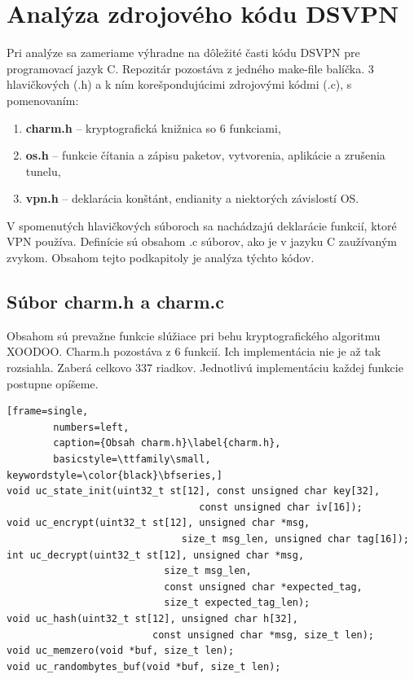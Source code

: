 \section{Analýza zdrojového kódu DSVPN}
 Pri analýze sa zameriame výhradne na dôležité časti kódu DSVPN pre programovací jazyk C. Repozitár pozostáva z jedného make-file balíčka\cite{make}. 3 hlavičkových (.h) a k ním korešpondujúcimi zdrojovými kódmi (.c), s pomenovaním:
 \begin{enumerate}
 	\item \textbf{charm.h} -- kryptografická knižnica so 6 funkciami,
 	\item \textbf{os.h} -- funkcie čítania a zápisu paketov, vytvorenia, aplikácie a zrušenia tunelu,
 	\item \textbf{vpn.h} -- deklarácia konštánt, endianity\cite{endianita} a niektorých závislostí OS.
 \end{enumerate}

 V spomenutých hlavičkových súboroch sa nachádzajú deklarácie funkcií, ktoré VPN používa. Definície sú obsahom .c súborov, ako je v jazyku C zaužívaným zvykom. Obsahom tejto podkapitoly je analýza týchto kódov. 
 
 \subsection{Súbor charm.h a charm.c}
 Obsahom sú prevažne funkcie slúžiace pri behu kryptografického algoritmu XOODOO. Charm.h pozostáva z 6 funkcií. Ich implementácia nie je až tak rozsiahla. Zaberá celkovo 337 riadkov. Jednotlivú implementáciu každej funkcie postupne opíšeme. 
 
   \begin{minipage}{\linewidth} 	
  	\begin{lstlisting}[frame=single,
  		numbers=left,
  		caption={Obsah charm.h}\label{charm.h},
  		basicstyle=\ttfamily\small, keywordstyle=\color{black}\bfseries,]
void uc_state_init(uint32_t st[12], const unsigned char key[32], 
				  			 	 const unsigned char iv[16]);
void uc_encrypt(uint32_t st[12], unsigned char *msg, 
							  size_t msg_len, unsigned char tag[16]);	
int uc_decrypt(uint32_t st[12], unsigned char *msg, 
			   			   size_t msg_len,
			   			   const unsigned char *expected_tag, 
			   			   size_t expected_tag_len);
void uc_hash(uint32_t st[12], unsigned char h[32],
			 			 const unsigned char *msg, size_t len);
void uc_memzero(void *buf, size_t len);
void uc_randombytes_buf(void *buf, size_t len);
  		 	\end{lstlisting}
  	\end{minipage}\\

